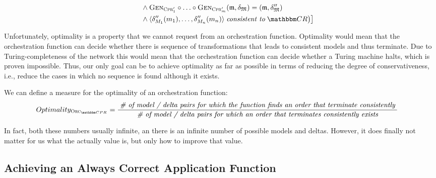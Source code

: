 \begin{definition}
\begin{align*}
            & \formulaskip \formulaskip
            \land \generalizationfunction{\consistencypreservationrule{1}'} \concatfunction \dots \concatfunction \generalizationfunction{\consistencypreservationrule{m}'}(\modeltuple{m}, \changetuple{\metamodeltuple{M}}) = (\modeltuple{m}, \changetuple{\metamodeltuple{M}}'')\\
            & \formulaskip \formulaskip
            \land \tupled{\change{\metamodel{M}{1}}''(\model{m}{1}), \dots, \change{\metamodel{M}{n}}''(\model{m}{n})} \consistenttomath \consistencyrelationset{CR}
        \bigr) \bigr]
    \end{align*}
\end{definition}

Unfortunately, optimality is a property that we cannot request from an orchestration function. Optimality would mean that the orchestration function can decide whether there is sequence of transformations that leads to consistent models and thus terminate.
Due to Turing-completeness of the network this would mean that the orchestration function can decide whether a Turing machine halts, which is proven impossible.
Thus, our only goal can be to achieve optimality as far as possible in terms of reducing the degree of conservativeness, i.e., reduce the cases in which no sequence is found although it exists.

We can define a measure for the optimality of an orchestration function:
\begin{align*}
    &
    Optimality_{\orcfunction{\consistencypreservationruleset{}}} = \frac{\mathtext{\# of model / delta pairs for which the function finds an order that terminate consistently}}{\mathtext{\# of model / delta pairs for which an order that terminates consistently exists}}
\end{align*}

In fact, both these numbers usually infinite, an there is an infinite number of possible models and deltas. However, it does finally not matter for us what the actually value is, but only how to improve that value.



\subsection{Achieving an Always Correct Application Function}

